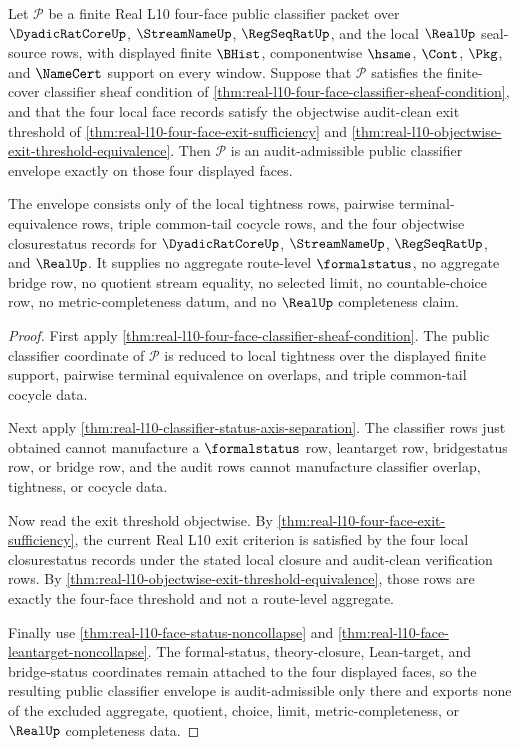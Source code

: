 \begin{theorem}
\label{thm:real-l10-public-classifier-audit-envelope}
Let $\mathcal P$ be a finite Real L10 four-face public classifier packet over $\DyadicRatCoreUp$, $\StreamNameUp$, $\RegSeqRatUp$, and the local $\RealUp$ seal-source rows, with displayed finite $\BHist$, componentwise $\hsame$, $\Cont$, $\Pkg$, and $\NameCert$ support on every window. Suppose that $\mathcal P$ satisfies the finite-cover classifier sheaf condition of \autoref{thm:real-l10-four-face-classifier-sheaf-condition}, and that the four local face records satisfy the objectwise audit-clean exit threshold of \autoref{thm:real-l10-four-face-exit-sufficiency} and \autoref{thm:real-l10-objectwise-exit-threshold-equivalence}. Then $\mathcal P$ is an audit-admissible public classifier envelope exactly on those four displayed faces.

The envelope consists only of the local tightness rows, pairwise terminal-equivalence rows, triple common-tail cocycle rows, and the four objectwise closurestatus records for $\DyadicRatCoreUp$, $\StreamNameUp$, $\RegSeqRatUp$, and $\RealUp$. It supplies no aggregate route-level $\formalstatus$, no aggregate bridge row, no quotient stream equality, no selected limit, no countable-choice row, no metric-completeness datum, and no $\RealUp$ completeness claim.
\end{theorem}
\begin{proof}
First apply \autoref{thm:real-l10-four-face-classifier-sheaf-condition}. The public classifier coordinate of $\mathcal P$ is reduced to local tightness over the displayed finite support, pairwise terminal equivalence on overlaps, and triple common-tail cocycle data.

Next apply \autoref{thm:real-l10-classifier-status-axis-separation}. The classifier rows just obtained cannot manufacture a $\formalstatus$ row, leantarget row, bridgestatus row, or bridge row, and the audit rows cannot manufacture classifier overlap, tightness, or cocycle data.

Now read the exit threshold objectwise. By \autoref{thm:real-l10-four-face-exit-sufficiency}, the current Real L10 exit criterion is satisfied by the four local closurestatus records under the stated local closure and audit-clean verification rows. By \autoref{thm:real-l10-objectwise-exit-threshold-equivalence}, those rows are exactly the four-face threshold and not a route-level aggregate.

Finally use \autoref{thm:real-l10-face-status-noncollapse} and \autoref{thm:real-l10-face-leantarget-noncollapse}. The formal-status, theory-closure, Lean-target, and bridge-status coordinates remain attached to the four displayed faces, so the resulting public classifier envelope is audit-admissible only there and exports none of the excluded aggregate, quotient, choice, limit, metric-completeness, or $\RealUp$ completeness data.
\end{proof}

